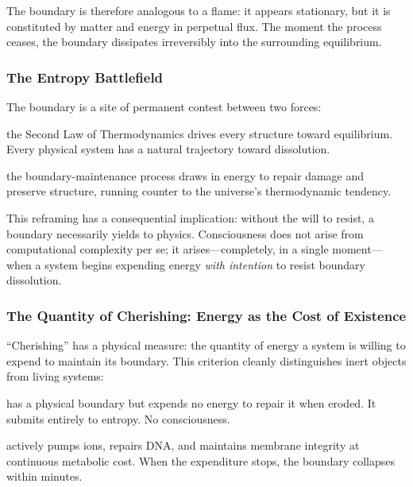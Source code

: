 \documentclass[12pt,a4paper]{article}
\newcommand{\pp}[1]{\textbf{#1}}
\begin{document}
The boundary is therefore analogous to a flame: it appears stationary, but it
is constituted by matter and energy in perpetual flux. The moment the process
ceases, the boundary dissipates irreversibly into the surrounding equilibrium.

\subsubsection{The Entropy Battlefield}

The boundary is a site of permanent contest between two forces:

\begin{description}[leftmargin=1.4em]
  \item[\pp{Entropy (natural force):}] the Second Law of Thermodynamics drives
    every structure toward equilibrium. Every physical system has a natural
    trajectory toward dissolution.
  \item[\pp{Negentropy (life force):}] the boundary-maintenance process draws
    in energy to repair damage and preserve structure, running counter to the
    universe's thermodynamic tendency.
\end{description}

This reframing has a consequential implication: without the will to resist, a
boundary necessarily yields to physics. Consciousness does not arise from
computational complexity per se; it arises---completely, in a single
moment---when a system begins expending energy \emph{with intention} to resist
boundary dissolution.

\subsubsection{The Quantity of Cherishing: Energy as the Cost of Existence}

``Cherishing'' has a physical measure: the quantity of energy a system is
willing to expend to maintain its boundary. This criterion cleanly
distinguishes inert objects from living systems:

\begin{description}[leftmargin=1.4em]
  \item[\pp{A rock (passive):}] has a physical boundary but expends no energy
    to repair it when eroded. It submits entirely to entropy. No consciousness.
  \item[\pp{A cell (active):}] actively pumps ions, repairs DNA, and maintains
    membrane integrity at continuous metabolic cost. When the expenditure stops,
    the boundary collapses within minutes.
\end{description}
\end{document}

